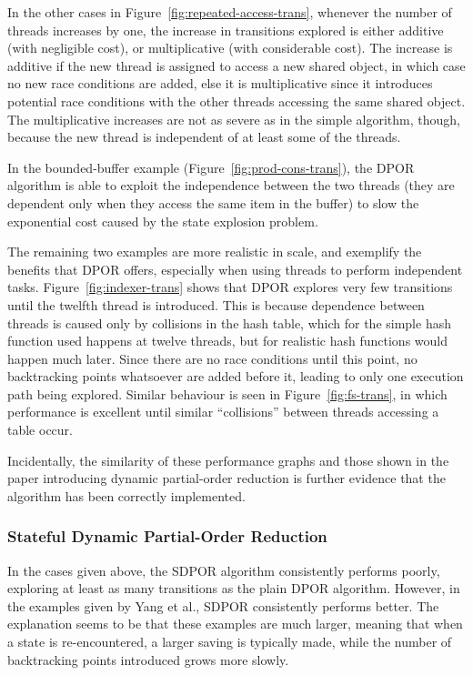 \documentclass[12pt,a4paper,twoside,openright]{report}
\begin{document}
In the other cases in
Figure~\ref{fig:repeated-access-trans},
whenever the number of threads increases
by one, the increase
in transitions explored
is either additive (with negligible cost),
or multiplicative (with considerable cost).
The increase is additive if the new thread
is assigned to access a new shared object,
in which case no new race conditions are
added, else it is multiplicative since
it introduces potential race conditions
with the other threads accessing the same
shared object.
The multiplicative increases are
not as severe as in the
simple algorithm, though, because the new
thread is independent of at least some of
the threads.

In the bounded-buffer example
(Figure~\ref{fig:prod-cons-trans}),
the DPOR algorithm is able to exploit
the independence between the two threads
(they are dependent only when they
access the same item in the buffer) to
slow the
exponential cost caused by the
state explosion problem.

The remaining two examples are more
realistic in scale, and exemplify the
benefits that DPOR offers, especially
when using threads to perform independent tasks.
Figure~\ref{fig:indexer-trans} shows that
DPOR explores very few transitions until
the twelfth thread is introduced.
This is because dependence between
threads is caused only by collisions
in the hash table, which for the simple
hash function used happens at twelve threads,
but for realistic hash functions would
happen much later. Since there are no
race conditions until this point,
no backtracking points whatsoever are added
before it, leading to only one execution path
being explored. Similar behaviour is seen in
Figure~\ref{fig:fs-trans}, in which performance
is excellent until similar ``collisions''
between threads accessing a table occur.

Incidentally, the similarity of these performance
graphs and those shown in the paper introducing
dynamic partial-order reduction \cite{flan05}
is further evidence that the algorithm has
been correctly implemented.

\subsubsection{Stateful Dynamic Partial-Order Reduction}
In the cases given above, the SDPOR algorithm
consistently performs poorly, exploring at
least as many transitions as the plain
DPOR algorithm. However, in the examples
given by Yang et al.\@ \cite{yang08},
SDPOR consistently performs better.
The explanation seems to be that
these examples are much larger, meaning
that when a state is re-encountered,
a larger saving is typically made,
while the number of backtracking
points introduced grows more slowly.
\end{document}
